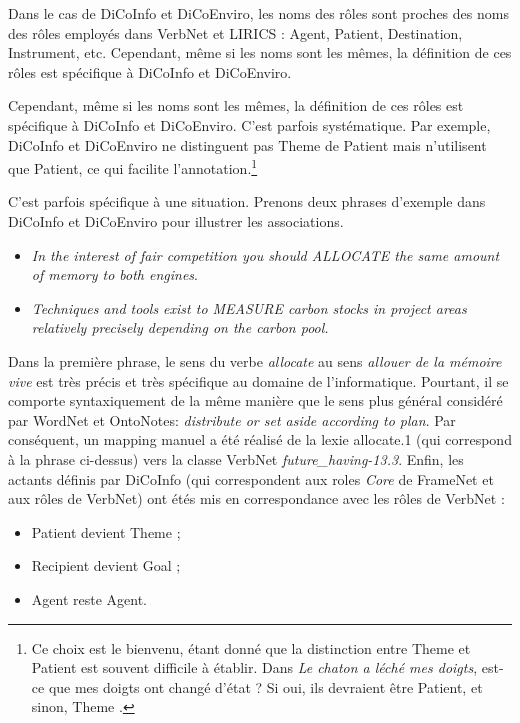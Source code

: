 Dans le cas de DiCoInfo et DiCoEnviro, les noms des rôles sont proches des noms
des rôles employés dans VerbNet et LIRICS \citep{bonial2011hierarchical} :
Agent, Patient, Destination, Instrument, etc. Cependant, même si les noms sont
les mêmes, la définition de ces rôles est spécifique à DiCoInfo et DiCoEnviro.

Cependant, même si les noms sont les mêmes, la définition de ces rôles est
spécifique à DiCoInfo et DiCoEnviro. C'est parfois systématique. Par exemple,
DiCoInfo et DiCoEnviro ne distinguent pas Theme de Patient mais n'utilisent que
Patient, ce qui facilite l'annotation.\footnote{Ce choix est le bienvenu, étant
    donné que la distinction entre Theme et Patient est souvent difficile à
    établir. Dans \textit{Le chaton a léché mes doigts}, est-ce que mes doigts
ont changé d'état ? Si oui, ils devraient être Patient, et sinon, Theme
\cite[p.~5]{palmer2010semantic}.}

C'est parfois spécifique à une situation. Prenons deux phrases d'exemple dans
DiCoInfo et DiCoEnviro pour illustrer les associations.

\begin{itemize}
    \item \textit{In the interest of fair competition you should ALLOCATE the
        same amount of memory to both engines}.
    \item \textit{Techniques and tools exist to MEASURE carbon stocks in project areas
        relatively precisely depending on the carbon pool.}
\end{itemize}

Dans la première phrase, le sens du verbe \textit{allocate} au sens
\textit{allouer de la mémoire vive} est très précis et très spécifique au domaine
de l'informatique. Pourtant, il se comporte syntaxiquement de la même manière
que le sens plus général considéré par WordNet et OntoNotes: \textit{distribute
or set aside according to plan}. Par conséquent, un mapping manuel a été
réalisé de la lexie allocate.1 (qui correspond à la phrase ci-dessus) vers la
classe VerbNet \textit{future\_having-13.3}. Enfin, les actants définis par
DiCoInfo (qui correspondent aux roles \textit{Core} de FrameNet et aux rôles de
VerbNet) ont étés mis en correspondance avec les rôles de VerbNet :

\begin{itemize}
    \item Patient devient Theme ;
    \item Recipient devient Goal ;
    \item Agent reste Agent.
\end{itemize}

